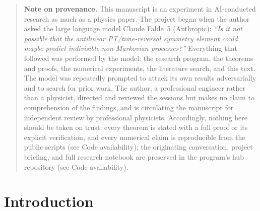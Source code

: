 \documentclass[11pt]{article}
\theoremstyle{definition}
\theoremstyle{remark}
\begin{document}
\begin{abstract}
proved for the finite core; the ghost-induced observability argued at
tree level);
(vi)~apparent superluminal signaling enters at the two points we
identify (the conditioning point provably the unique marginal-breaker in the finite core, over the framework's dilated local dynamics; the completions door left open), both simulated: survival conditioning (recovering the
known resolution of the Lee--Hsieh--Flammia--Lee no-signaling
controversy in one bookkeeping, with the signal magnitude of its
broken-phase dimer analog now in
closed form, $\mathrm{TV}(\infty)=\tilde\kappa/\sin\theta$)
and conservative completions (a messaging protocol whose latency
through infinity is distance-independent in the explosive
class (in the cases tested), and which the minimal process silences). The findings assemble
into a trilemma: \emph{coupled ghosts, empirical Lorentz
invariance, definite configurations---any two, never all three} (at
tree level).
\end{abstract}

\newpage
\begin{quote}
\small\noindent\textbf{Note on provenance.} This manuscript is an
experiment in AI-conducted research as much as a physics paper. The
project began when the author asked the large language model Claude
Fable~5 (Anthropic): \emph{``Is it not possible that the antilinear
PT/time-reversal symmetry element could maybe predict indivisible
non-Markovian processes?''} Everything that followed was performed by
the model: the research program, the theorems and proofs, the numerical
experiments, the literature search, and this text. The model was
repeatedly prompted to attack its own results adversarially and to
search for prior work. The author, a professional engineer rather than
a physicist, directed and reviewed the sessions but makes no claim to
comprehension of the findings, and is circulating the manuscript for
independent review by professional physicists. Accordingly, nothing
here should be taken on trust: every theorem is stated with a full
proof or its explicit verification, and every numerical claim is
reproducible from the public scripts (see Code availability); the
originating conversation, project briefing, and full research
notebook are preserved in the program's hub repository (see Code
availability).
\end{quote}

\newpage
\tableofcontents
\newpage

\section{Introduction}
\label{sec:intro}
\end{document}
